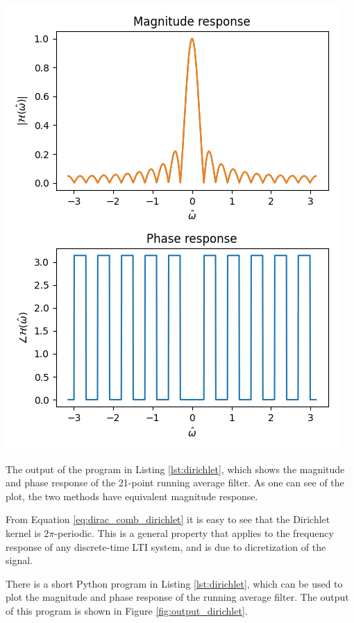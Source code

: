 \begin{marginfigure}
    \begin{center}
        \includegraphics[width=\textwidth]{code/019_frequency_response/dirichlet21.png}
    \end{center}
    \caption{The output of the program in Listing \ref{lst:dirichlet}, which shows the magnitude and phase response of the 21-point running average filter. As one can see of the plot, the two methods have equivalent magnitude response.}
    \label{fig:output_dirichlet}
\end{marginfigure}

From Equation \ref{eq:dirac_comb_dirichlet} it is easy to see that the Dirichlet kernel is $2\pi$-periodic.
This is a general property that
applies to the frequency response of any discrete-time LTI system,
and is due to dicretization of the signal.

There is a short Python program in Listing \ref{lst:dirichlet}, which
can be used to plot the magnitude and phase response of the running
average filter. The output of this program is shown in
Figure \ref{fig:output_dirichlet}.



